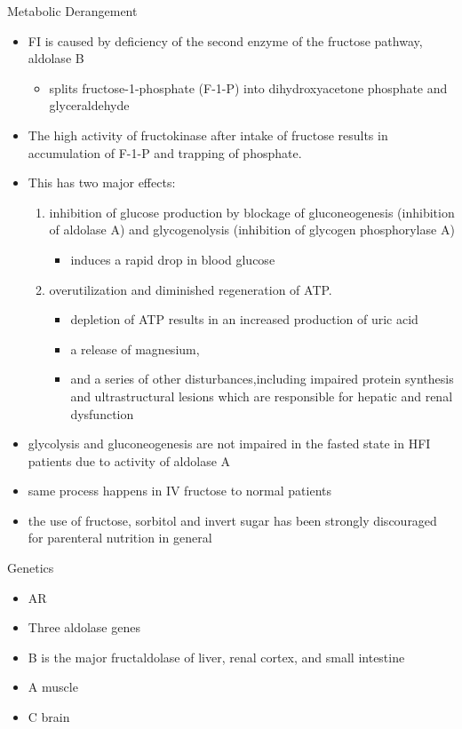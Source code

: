 \documentclass[presentation, smaller]{beamer}
\begin{document}
\begin{frame}[label={sec:org3010db3}]{Metabolic Derangement}
\begin{itemize}
\item FI is caused by deficiency of the second enzyme of the fructose pathway, aldolase B
\begin{itemize}
\item splits fructose-1-phosphate (F-1-P) into dihydroxyacetone phosphate and glyceraldehyde
\end{itemize}
\item The high activity of fructokinase after intake of fructose results in accumulation of F-1-P and trapping of phosphate.
\item This has two major effects:
\begin{enumerate}
\item inhibition of glucose production by blockage of gluconeogenesis
(inhibition of aldolase A) and glycogenolysis (inhibition of glycogen phosphorylase A)
\begin{itemize}
\item induces a rapid drop in blood glucose
\end{itemize}
\item overutilization and diminished regeneration of ATP.
\begin{itemize}
\item depletion of ATP results in an increased production of uric acid
\item a release of magnesium,
\item and a series of other disturbances,including impaired protein
synthesis and ultrastructural lesions which are responsible for
hepatic and renal dysfunction
\end{itemize}
\end{enumerate}
\item glycolysis and gluconeogenesis are not impaired in the fasted state in HFI patients due to activity of aldolase A

\item same process happens in IV fructose to normal patients
\item the use of fructose, sorbitol and invert sugar has been strongly discouraged for parenteral nutrition in general
\end{itemize}
\end{frame}

\begin{frame}[label={sec:org69d550e}]{Genetics}
\begin{itemize}
\item AR
\item Three aldolase genes
\item B is the major fructaldolase of liver, renal cortex, and small intestine
\item A muscle
\item C brain
\end{itemize}
\end{frame}
\end{document}

